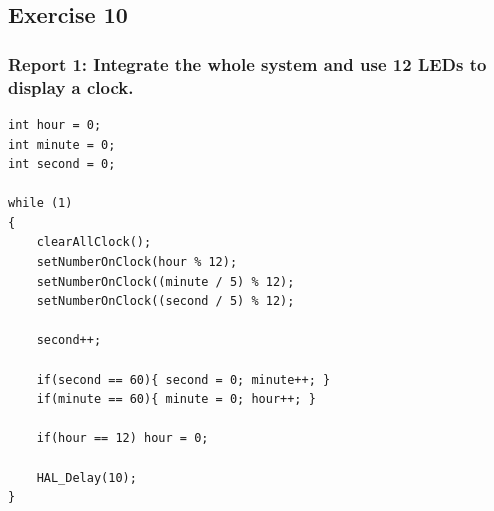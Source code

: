 \documentclass[a4paper,12pt]{article}
\begin{document}
\subsection{Exercise 10}
\subsubsection{Report 1: Integrate the whole system and use 12 LEDs to display a clock.}
\begin{lstlisting}
int hour = 0;
int minute = 0;
int second = 0;

while (1)
{
	clearAllClock();
	setNumberOnClock(hour % 12);
	setNumberOnClock((minute / 5) % 12);
	setNumberOnClock((second / 5) % 12);
	
	second++;
	
	if(second == 60){ second = 0; minute++; }
	if(minute == 60){ minute = 0; hour++; }
	
	if(hour == 12) hour = 0;
	
	HAL_Delay(10);
}
\end{lstlisting}
\end{document}
